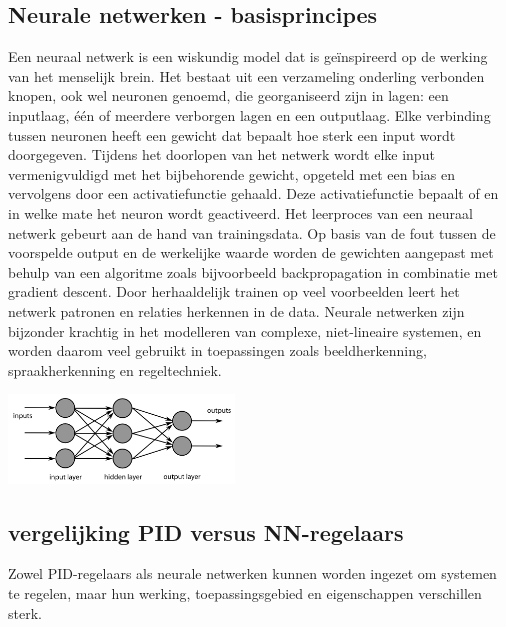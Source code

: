 \subsection{Neurale netwerken - basisprincipes}
\cite{GeeksRNN2024}Een neuraal netwerk is een wiskundig model dat is geïnspireerd op de werking van het menselijk brein. Het bestaat uit een verzameling onderling verbonden knopen, ook wel neuronen genoemd, die georganiseerd zijn in lagen: een inputlaag, één of meerdere verborgen lagen en een outputlaag. Elke verbinding tussen neuronen heeft een gewicht dat bepaalt hoe sterk een input wordt doorgegeven. Tijdens het doorlopen van het netwerk wordt elke input vermenigvuldigd met het bijbehorende gewicht, opgeteld met een bias en vervolgens door een activatiefunctie gehaald. Deze activatiefunctie bepaalt of en in welke mate het neuron wordt geactiveerd. Het leerproces van een neuraal netwerk gebeurt aan de hand van trainingsdata. Op basis van de fout tussen de voorspelde output en de werkelijke waarde worden de gewichten aangepast met behulp van een algoritme zoals bijvoorbeeld backpropagation in combinatie met gradient descent. Door herhaaldelijk trainen op veel voorbeelden leert het netwerk patronen en relaties herkennen in de data. Neurale netwerken zijn bijzonder krachtig in het modelleren van complexe, niet-lineaire systemen, en worden daarom veel gebruikt in toepassingen zoals beeldherkenning, spraakherkenning en regeltechniek.
\begin{center}
\centering
\includegraphics[width=0.45\textwidth]{./afbeeldingen/Neuraalnetwerkpng.png}
\label{fig:Illustratie_neuraal_netwerk}
\end{center}
\subsection{vergelijking PID versus NN-regelaars}
Zowel PID-regelaars als neurale netwerken kunnen worden ingezet om systemen te regelen, maar hun werking, toepassingsgebied en eigenschappen verschillen sterk.
